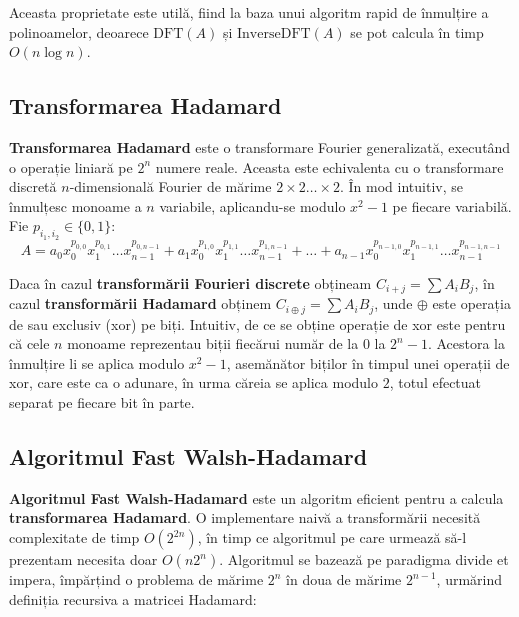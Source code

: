Aceasta proprietate este utilă, fiind la baza unui algoritm rapid de înmulțire a
polinoamelor, deoarece $\text{DFT}(A)$ și $\text{InverseDFT}(A)$ se pot calcula
în timp $O(n \log n)$.

\subsection{Transformarea Hadamard}
\label{hadamard}

\textbf{Transformarea Hadamard} este o transformare Fourier generalizată,
executând o operație liniară pe $2^{n}$ numere reale. Aceasta este echivalenta
cu o transformare discretă $n$-dimensională Fourier de mărime
$2 \times 2 \ldots \times 2$. În mod intuitiv, se înmulțesc monoame a $n$
variabile, aplicandu-se modulo $x^{2}-1$ pe fiecare variabilă. Fie $p_{i_{1}, i_{2}} \in \{0, 1\}$:
\begin{equation}
  A = a_{0} x_{0}^{p_{0, 0}} x_{1}^{p_{0, 1}} \ldots x_{n-1}^{p_{0, n-1}}
  + a_{1} x_{0}^{p_{1, 0}} x_{1}^{p_{1, 1}} \ldots x_{n-1}^{p_{1, n-1}}
  + \ldots
  + a_{n-1} x_{0}^{p_{n-1, 0}} x_{1}^{p_{n-1, 1}} \ldots x_{n-1}^{p_{n-1, n-1}}
\end{equation}

Daca în cazul \textbf{transformării Fourieri discrete} obțineam
$C_{i+j} = \displaystyle\sum\limits A_{i} B_{j}$, în cazul \textbf{transformării Hadamard} obținem
$C_{i \oplus j} = \displaystyle\sum\limits A_{i} B_{j}$, unde $\oplus$ este operația de sau exclusiv
(xor) pe biți. Intuitiv, de ce se obține operație de xor este pentru că
cele $n$ monoame reprezentau biții fiecărui număr de la $0$ la $2^{n} - 1$.
Acestora la înmulțire li se aplica modulo $x^{2} - 1$, asemănător biților în
timpul unei operații de xor, care este ca o adunare, în urma căreia se aplica
modulo $2$, totul efectuat separat pe fiecare bit în parte.

\subsection{Algoritmul Fast Walsh-Hadamard}
\label{fasthadamard}

\textbf{Algoritmul Fast Walsh-Hadamard} \cite{fwht} este un algoritm eficient pentru a
calcula \textbf{transformarea Hadamard}. O implementare naivă a transformării
necesită complexitate de timp $O(2^{2n})$, în timp ce algoritmul pe care urmează
să-l prezentam necesita doar $O(n2^{n})$. Algoritmul se bazează pe paradigma
divide et impera, împărțind o problema de mărime $2^{n}$ în doua de mărime
$2^{n-1}$, urmărind definiția recursiva a matricei Hadamard:

